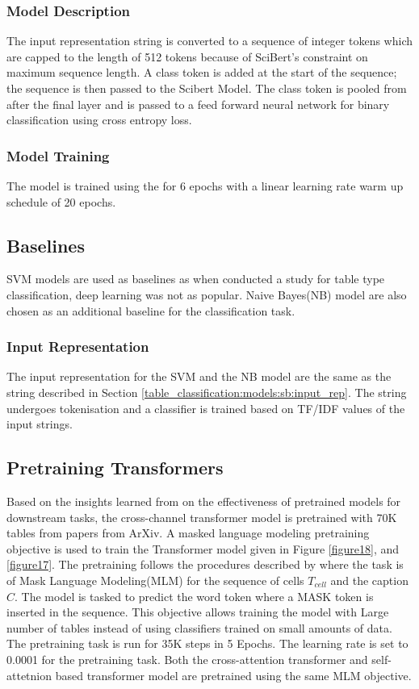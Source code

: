 \subsubsection{Model Description}
The input representation string is converted to a sequence of integer tokens which are capped to the length of 512 tokens because of SciBert's constraint on maximum sequence length. A class token is added at the start of the sequence; the sequence is then passed to the Scibert Model. The class token is pooled from after the final layer and is passed to a feed forward neural network for binary classification using cross entropy loss. 


\subsubsection{Model Training}
The model is trained using the for 6 epochs with a linear learning rate warm up schedule of 20 epochs.

\subsection{Baselines}
SVM models are used as baselines as when \cite{kim2012scientific} conducted a study for table type classification, deep learning was not as popular. Naive Bayes(NB) model are also chosen as an additional baseline for the classification task. 

\subsubsection{Input Representation}
The input representation for the SVM and the NB model are the same as the string described in Section \ref{table_classification:models:sb:input_rep}. The string undergoes tokenisation and a classifier is trained based on TF/IDF values of the input strings. 

\subsection{Pretraining Transformers}
\label{table_classification:models:encoder-model:pre-train}
Based on the insights learned from \cite{hernandez2021scaling} on the effectiveness of pretrained models for downstream tasks, the cross-channel transformer model is pretrained with 70K tables from papers from ArXiv. A masked language modeling pretraining objective is used to train the Transformer model given in Figure \ref{figure18}, and \ref{figure17}. The pretraining follows the procedures described by \cite{deng2020turl} where the task is of Mask Language Modeling(MLM) for the sequence of cells $T_{cell}$ and the caption $C$. The model is tasked to predict the word token where a MASK token is inserted in the sequence.  This objective allows training the model with Large number of tables instead of using classifiers trained on small amounts of data. The pretraining task is run for 35K steps in 5 Epochs. The learning rate is set to 0.0001 for the pretraining task. Both the cross-attention transformer and self-attetnion based transformer model are pretrained using the same MLM objective. 

